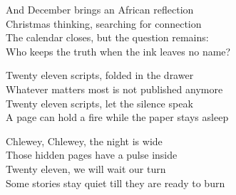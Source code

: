 \begin{lyrics}
And December brings an African reflection\\
Christmas thinking, searching for connection\\
The calendar closes, but the question remains:\\
Who keeps the truth when the ink leaves no name?

Twenty eleven scripts, folded in the drawer\\
Whatever matters most is not published anymore\\
Twenty eleven scripts, let the silence speak\\
A page can hold a fire while the paper stays asleep

Chlewey, Chlewey, the night is wide\\
Those hidden pages have a pulse inside\\
Twenty eleven, we will wait our turn\\
Some stories stay quiet till they are ready to burn
\end{lyrics}



